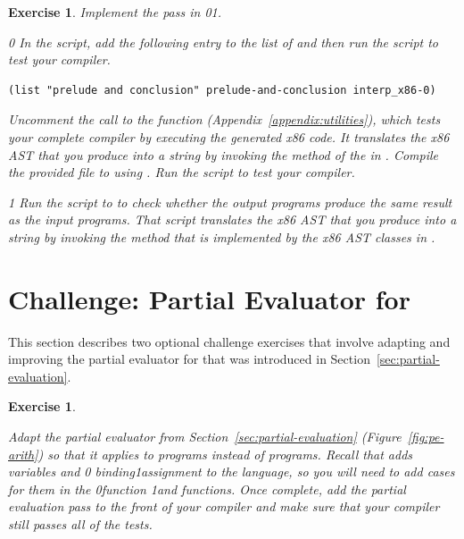 \documentclass[7x10]{TimesAPriori_MIT}%
\def\racketEd{0}
\def\pythonEd{1}
\def\edition{1}
\newcommand{\racket}[1]{{\if\edition\racketEd{#1}\fi}}
\newcommand{\python}[1]{{\if\edition\pythonEd #1\fi}}
\newtheorem{exercise}[theorem]{Exercise}
\begin{document}
\begin{exercise}\normalfont
%
Implement the  pass in
\racket{}\python{}.
%
{\if\edition\racketEd
In the  script, add the following entry to the
list of  and then run the script to test your compiler.
\begin{lstlisting}
(list "prelude and conclusion" prelude-and-conclusion interp_x86-0)
\end{lstlisting}
%  
Uncomment the call to the  function
(Appendix~\ref{appendix:utilities}), which tests your complete
compiler by executing the generated x86 code. It translates the x86
AST that you produce into a string by invoking the 
method of the  in . Compile
the provided  file to  using
. Run the script to test your compiler.
%
\fi}
{\if\edition\pythonEd
%
Run the  script to to check whether the output
programs produce the same result as the input programs. That script
translates the x86 AST that you produce into a string by invoking the
 method that is implemented by the x86 AST classes in
.
%
\fi}

\end{exercise}


\section{Challenge: Partial Evaluator for \LangVar{}}
\label{sec:pe-Lvar}

This section describes two optional challenge exercises that involve
adapting and improving the partial evaluator for \LangInt{} that was
introduced in Section~\ref{sec:partial-evaluation}.

\begin{exercise}\label{ex:pe-Lvar}
\normalfont
  
Adapt the partial evaluator from Section~\ref{sec:partial-evaluation}
(Figure~\ref{fig:pe-arith}) so that it applies to \LangVar{} programs
instead of \LangInt{} programs. Recall that \LangVar{} adds variables and
%
\racket{ binding}\python{assignment}
%
to the \LangInt{} language, so you will need to add cases for them in
the 
%
\racket{function}
%
\python{and  functions}.
%
Once complete, add the partial evaluation pass to the front of your
compiler and make sure that your compiler still passes all of the
tests.
\end{exercise}
\end{document}
